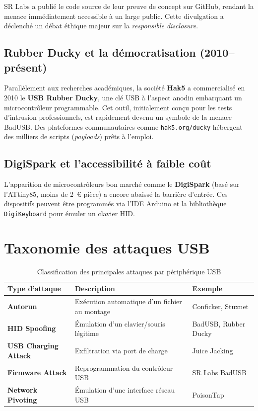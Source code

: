 \documentclass[12pt,a4paper]{report}
\begin{document}
\begin{infobox}
SR Labs a publié le code source de leur preuve de concept sur GitHub, rendant la menace immédiatement accessible à un large public. Cette divulgation a déclenché un débat éthique majeur sur la \textit{responsible disclosure}.
\end{infobox}

\subsection{Rubber Ducky et la démocratisation (2010--présent)}

Parallèlement aux recherches académiques, la société \textbf{Hak5} a commercialisé en 2010 le \textbf{USB Rubber Ducky}, une clé USB à l'aspect anodin embarquant un microcontrôleur programmable. Cet outil, initialement conçu pour les tests d'intrusion professionnels, est rapidement devenu un symbole de la menace BadUSB. Des plateformes communautaires comme \texttt{hak5.org/ducky} hébergent des milliers de scripts (\textit{payloads}) prêts à l'emploi.

\subsection{DigiSpark et l'accessibilité à faible coût}

L'apparition de microcontrôleurs bon marché comme le \textbf{DigiSpark} (basé sur l'ATtiny85, moins de 2~€ pièce) a encore abaissé la barrière d'entrée. Ces dispositifs peuvent être programmés via l'IDE Arduino et la bibliothèque \texttt{DigiKeyboard} pour émuler un clavier HID.

\section{Taxonomie des attaques USB}

\begin{table}[H]
  \centering
  \caption{Classification des principales attaques par périphérique USB}
  \label{tab:taxo}
  \begin{tabularx}{\linewidth}{>{\bfseries}l X X}
    \toprule
    Type d'attaque        & Description                                     & Exemple \\
    \midrule
    Autorun               & Exécution automatique d'un fichier au montage    & Conficker, Stuxnet \\
    HID Spoofing          & Émulation d'un clavier/souris légitime           & BadUSB, Rubber Ducky \\
    USB Charging Attack   & Exfiltration via port de charge                  & Juice Jacking \\
    Firmware Attack       & Reprogrammation du contrôleur USB                & SR Labs BadUSB \\
    Network Pivoting      & Émulation d'une interface réseau USB             & PoisonTap \\
    \bottomrule
  \end{tabularx}
\end{table}
\end{document}
